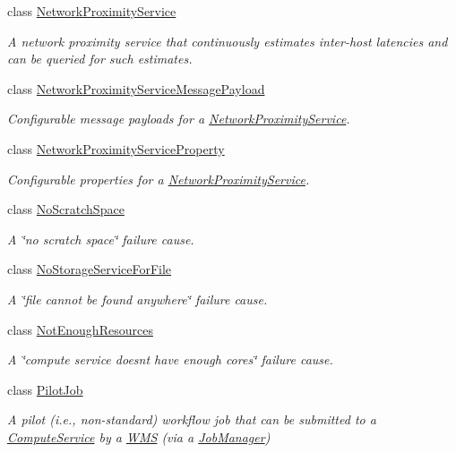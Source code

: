 \begin{DoxyCompactItemize}
class \hyperlink{classwrench_1_1_network_proximity_service}{Network\+Proximity\+Service}
\begin{DoxyCompactList}\small\item\em A network proximity service that continuously estimates inter-\/host latencies and can be queried for such estimates. \end{DoxyCompactList}\item 
class \hyperlink{classwrench_1_1_network_proximity_service_message_payload}{Network\+Proximity\+Service\+Message\+Payload}
\begin{DoxyCompactList}\small\item\em Configurable message payloads for a \hyperlink{classwrench_1_1_network_proximity_service}{Network\+Proximity\+Service}. \end{DoxyCompactList}\item 
class \hyperlink{classwrench_1_1_network_proximity_service_property}{Network\+Proximity\+Service\+Property}
\begin{DoxyCompactList}\small\item\em Configurable properties for a \hyperlink{classwrench_1_1_network_proximity_service}{Network\+Proximity\+Service}. \end{DoxyCompactList}\item 
class \hyperlink{classwrench_1_1_no_scratch_space}{No\+Scratch\+Space}
\begin{DoxyCompactList}\small\item\em A \char`\"{}no scratch space\char`\"{} failure cause. \end{DoxyCompactList}\item 
class \hyperlink{classwrench_1_1_no_storage_service_for_file}{No\+Storage\+Service\+For\+File}
\begin{DoxyCompactList}\small\item\em A \char`\"{}file cannot be found anywhere\char`\"{} failure cause. \end{DoxyCompactList}\item 
class \hyperlink{classwrench_1_1_not_enough_resources}{Not\+Enough\+Resources}
\begin{DoxyCompactList}\small\item\em A \char`\"{}compute service doesn\textquotesingle{}t have enough cores\char`\"{} failure cause. \end{DoxyCompactList}\item 
class \hyperlink{classwrench_1_1_pilot_job}{Pilot\+Job}
\begin{DoxyCompactList}\small\item\em A pilot (i.\+e., non-\/standard) workflow job that can be submitted to a \hyperlink{classwrench_1_1_compute_service}{Compute\+Service} by a \hyperlink{classwrench_1_1_w_m_s}{W\+MS} (via a \hyperlink{classwrench_1_1_job_manager}{Job\+Manager}) \end{DoxyCompactList}\item 

\end{DoxyCompactItemize}
